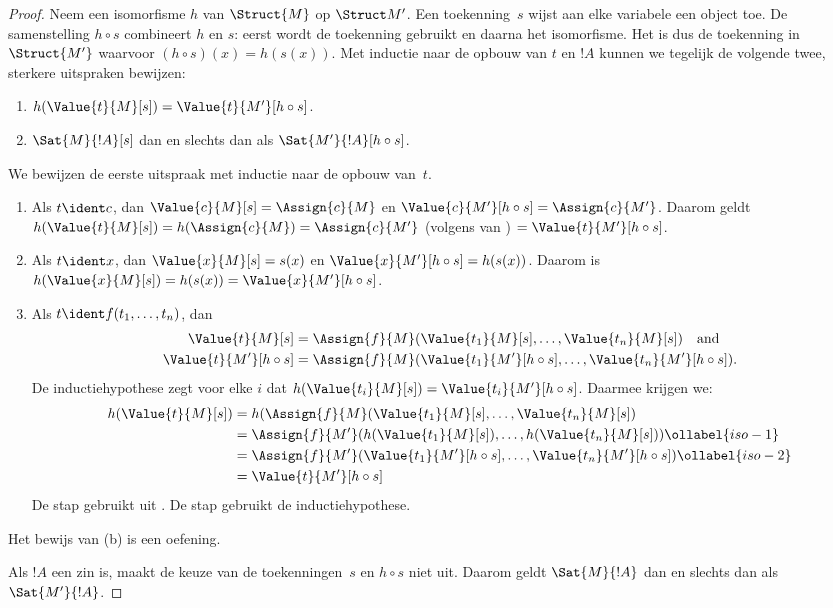 \documentclass[../../../include/open-logic-section]{subfiles}
\begin{document}
\begin{proof}
Neem een isomorfisme $h$ van $\Struct{M}$ op $\Struct M'$. Een
toekenning~$s$ wijst aan elke variabele een object toe.
De samenstelling $h \circ s$ combineert $h$ en $s$: eerst wordt de
toekenning gebruikt en daarna het isomorfisme. Het is dus de toekenning
in $\Struct{M'}$ waarvoor
$(h \circ s)(x) = h(s(x))$. Met inductie naar de opbouw van $t$ en $!A$
kunnen we tegelijk de volgende twee, sterkere uitspraken bewijzen:
\begin{enumerate}
  \item[a.] $h(\Value{t}{M}[s]) = \Value{t}{M'}[h\circ s]$.
  \item[b.] $\Sat{M}{!A}[s]$ dan en slechts dan als $\Sat{M'}{!A}[h \circ s]$.
\end{enumerate}
We bewijzen de eerste uitspraak met inductie naar de opbouw van~$t$.
\begin{enumerate}
\item Als $t \ident c$, dan $\Value{c}{M}[s] = \Assign{c}{M}$ en
  $\Value{c}{M'}[h \circ s] = \Assign{c}{M'}$. Daarom geldt
  $h(\Value{t}{M}[s]) = h(\Assign{c}{M}) = \Assign{c}{M'}$ (volgens
   van ) $=
  \Value{t}{M'}[h \circ s]$.
\item Als $t \ident x$, dan $\Value{x}{M}[s] = s(x)$ en
  $\Value{x}{M'}[h \circ s] = h(s(x))$. Daarom is $h(\Value{x}{M}[s]) =
  h(s(x)) = \Value{x}{M'}[h \circ s]$.
\item Als $t \ident f(t_1, \dots, t_n)$, dan
  \begin{align*}
    \Value{t}{M}[s] & = \Assign{f}{M}(\Value{t_1}{M}[s], \dots, \Value{t_n}{M}[s]) \quad\text{and}\\
  \Value{t}{M'}[h \circ s] & = \Assign{f}{M}(\Value{t_1}{M'}[h \circ
    s], \dots, \Value{t_n}{M'}[h \circ s]).
  \end{align*}
  De inductiehypothese zegt voor elke $i$ dat
  $h(\Value{t_i}{M}[s]) = \Value{t_i}{M'}[h\circ s]$. Daarmee krijgen
  we:
  \begin{align}
    h(\Value{t}{M}[s]) 
    & = h(\Assign{f}{M}(\Value{t_1}{M}[s], \dots, \Value{t_n}{M}[s]) \notag\\
    & = \Assign{f}{M'}(h(\Value{t_1}{M}[s]), \dots,
    h(\Value{t_n}{M}[s])) \ollabel{iso-1}\\
    & = \Assign{f}{M'}(\Value{t_1}{M'}[h \circ s], \dots,
    \Value{t_n}{M'}[h \circ s]) \ollabel{iso-2}\\
    & = \Value{t}{M'}[h\circ s] \notag
  \end{align}
  De stap  gebruikt  uit
  . De stap  gebruikt de
  inductiehypothese.
\end{enumerate}
Het bewijs van (b) is een oefening.

Als $!A$ een zin is, maakt de keuze van de toekenningen~$s$ en
$h \circ s$ niet uit. Daarom geldt $\Sat{M}{!A}$ dan en slechts dan als
$\Sat{M'}{!A}$.
\end{proof}
\end{document}
